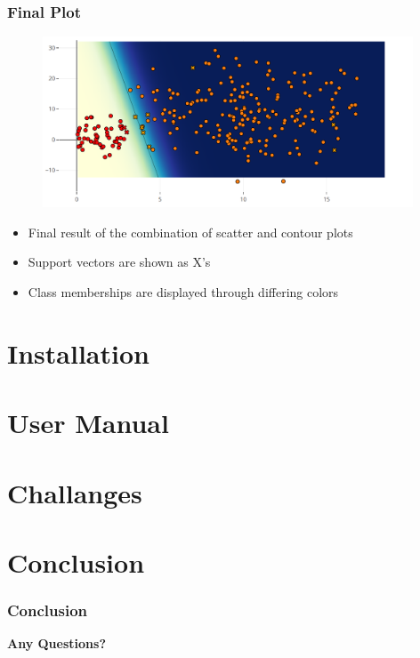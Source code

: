 \documentclass[english,hangout]{beamer}
\begin{document}
\begin{frame}
	\frametitle{Final Plot}
	\begin{figure}
		\centering
		\includegraphics[width=11cm]{FinalPlot.png}
	\end{figure}
	\begin{itemize}
		\item Final result of the combination of scatter and contour plots
		\item Support vectors are shown as X's
		\item Class memberships are displayed through differing colors
	\end{itemize}
\end{frame}

\section{Installation}

\section{User Manual}

\section{Challanges}

\section{Conclusion}
\begin{frame}
	\frametitle{Conclusion}

\end{frame}

\begin{frame}
	\begin{center}
		\textbf{Any Questions?}
	\end{center}
\end{frame}
\end{document}
